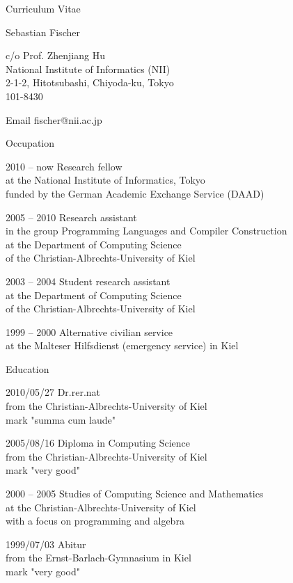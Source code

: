 \documentclass[a4paper,12pt,DIV=12]{scrartcl}
\begin{document}
\begin{cv}{Curriculum Vitae}
  \begin{cvlist}{}
  \item Sebastian Fischer
  \item
    c/o Prof. Zhenjiang Hu\\
    National Institute of Informatics (NII)\\
    2-1-2, Hitotsubashi, Chiyoda-ku, Tokyo\\
    101-8430
  \item[Email] fischer@nii.ac.jp
  \end{cvlist}
  \begin{cvlist}{Occupation}
  \item[2010 -- now]
    Research fellow\\
    at the National Institute of Informatics, Tokyo\\
    funded by the German Academic Exchange Service (DAAD)
  \item[2005 -- 2010]
    Research assistant\\
    in the group Programming Languages and Compiler Construction\\
    at the Department of Computing Science\\
    of the Christian-Albrechts-University of Kiel
  \item[2003 -- 2004]
    Student research assistant\\
    at the Department of Computing Science\\
    of the Christian-Albrechts-University of Kiel
  \item[1999 -- 2000]
    Alternative civilian service\\
    at the Malteser Hilfsdienst (emergency service) in Kiel
  \end{cvlist}
  \begin{cvlist}{Education}
  \item[2010/05/27]
    Dr.rer.nat\\
    from the Christian-Albrechts-University of Kiel\\
    mark "summa cum laude"
  \item[2005/08/16] 
    Diploma in Computing Science\\
    from the Christian-Albrechts-University of Kiel\\
    mark "very good"
  \item[2000 -- 2005] 
    Studies of Computing Science and Mathematics\\
    at the Christian-Albrechts-University of Kiel\\
    with a focus on programming and algebra
  \item[1999/07/03]
    Abitur\\
    from the Ernst-Barlach-Gymnasium in Kiel\\
    mark "very good"
  \end{cvlist}
\end{cv}
\end{document}
